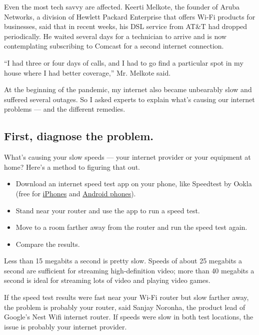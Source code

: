 Even the most tech savvy are affected. Keerti Melkote, the founder of
Aruba Networks, a division of Hewlett Packard Enterprise that offers
Wi-Fi products for businesses, said that in recent weeks, his DSL
service from AT\&T had dropped periodically. He waited several days for
a technician to arrive and is now contemplating subscribing to Comcast
for a second internet connection.

``I had three or four days of calls, and I had to go find a particular
spot in my house where I had better coverage,'' Mr. Melkote said.

At the beginning of the pandemic, my internet also became unbearably
slow and suffered several outages. So I asked experts to explain what's
causing our internet problems --- and the different remedies.

\hypertarget{first-diagnose-the-problem}{%
\subsection{First, diagnose the
problem.}\label{first-diagnose-the-problem}}

What's causing your slow speeds --- your internet provider or your
equipment at home? Here's a method to figuring that out.

\begin{itemize}
\item
  Download an internet speed test app on your phone, like Speedtest by
  Ookla (free for
  \href{https://apps.apple.com/us/app/speedtest-by-ookla/id300704847}{iPhones}
  and
  \href{https://play.google.com/store/apps/details?id=org.zwanoo.android.speedtest\&hl=en_US}{Android
  phones}).
\item
  Stand near your router and use the app to run a speed test.
\item
  Move to a room farther away from the router and run the speed test
  again.
\item
  Compare the results.
\end{itemize}

Less than 15 megabits a second is pretty slow. Speeds of about 25
megabits a second are sufficient for streaming high-definition video;
more than 40 megabits a second is ideal for streaming lots of video and
playing video games.

If the speed test results were fast near your Wi-Fi router but slow
farther away, the problem is probably your router, said Sanjay Noronha,
the product lead of Google's Nest Wifi internet router. If speeds were
slow in both test locations, the issue is probably your internet
provider.

